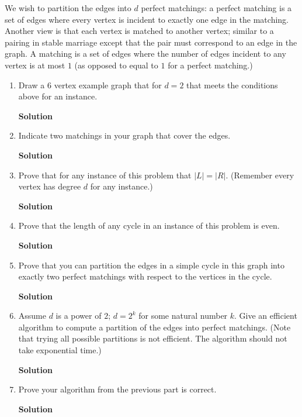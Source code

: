\documentclass{article}
\begin{document}
We wish to partition the edges into $d$ perfect matchings: a perfect matching is a set of edges where every vertex is incident to exactly one edge in the matching. Another view is that each vertex is matched to another vertex; similar to a pairing in stable marriage except that the pair must correspond to an edge in the graph. A matching is a set of edges where the number of edges incident to any vertex is at most $1$ (as opposed to equal to $1$ for a perfect matching.)
\begin{enumerate}
\item Draw a $6$ vertex example graph that for $d=2$ that meets the conditions above for an instance.
\begin{mdframed}
\textbf{Solution}

\end{mdframed}
\item Indicate two matchings in your graph that cover the edges.
\begin{mdframed}
\textbf{Solution}

\end{mdframed}
\item Prove that for any instance of this problem that $|L|=|R|$. (Remember every vertex has degree $d$ for any instance.)
\begin{mdframed}
\textbf{Solution}

\end{mdframed}
\item Prove that the length of any cycle in an instance of this problem is even.
\begin{mdframed}
\textbf{Solution}

\end{mdframed}
\item Prove that you can partition the edges in a simple cycle in this graph into exactly two perfect matchings with respect to the vertices in the cycle.
\begin{mdframed}
\textbf{Solution}

\end{mdframed}
\item Assume $d$ is a power of $2$; $d=2^k$ for some natural number $k$. Give an efficient algorithm to compute a partition of the edges into perfect matchings. (Note that trying all possible partitions is not efficient. The algorithm should not take exponential time.)
\begin{mdframed}
\textbf{Solution}

\end{mdframed}
\item Prove your algorithm from the previous part is correct.
\begin{mdframed}
\textbf{Solution}

\end{mdframed}
\end{enumerate}
\end{document}
